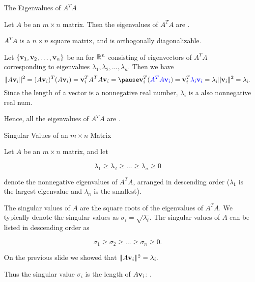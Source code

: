 \documentclass[xcolor=dvipsnames,aspectratio=169,t]{beamer}
\begin{document}
\begin{frame}{The Eigenvalues of $A^T A$}
  \smallskip
  
  \begin{theorem}
    Let $A$ be an $m \times n$ matrix.
    Then the \alert{eigenvalues of $A^TA$} are .
  \end{theorem}
  \medskip

  \pause
  \smallskip
  
  $A^T A$ is a  $n\times n$ square matrix, and is \alert{orthogonally diagonalizable.}
  \medskip
  
  Let $\{ \mathbf{v}_1,\mathbf{v}_2,\ldots,\mathbf{v}_n \}$ be an  for $\mathbb{R}^n$ consisting of eigenvectors of $A^T A$ corresponding to eigenvalues $\lambda_1,\lambda_2,\ldots,\lambda_n$.
  \pause
  Then we have
  \[ \| A \v_i \|^2 = (A\v_i)^T (A\v_i) = \v_i^T A^TA \v_i =
  \pause 
  \v_i^T (\colorb{A^TA \v_i}) = \v_i^T \colorb{\lambda_i \v_i} =
  \lambda_i \| \v_i \| ^2 = \lambda_i. \]
  Since the length of a vector is a nonnegative real number, $\lambda_i$ is a also nonnegative real num.
  \medskip
  
  Hence, all the \alert{eigenvalues of $A^T A$} are .
  \hfill\blue{\qed}
\end{frame}


\begin{frame}{Singular Values of an $m \times n$ Matrix}
  \smallskip

  Let $A$ be an $m \times n$ matrix, and let 
  \vspace*{-1em}
  
  \[  \lambda_1 \geq \lambda_2 \geq \ldots \geq \lambda_n \geq 0\]
  \vspace*{-1em}
  
  denote the nonnegative \alert{eigenvalues of $A^T A$}, arranged in descending order 
  ($\lambda_1$ is the largest eigenvalue and $\lambda_n$ is the smallest).
  \medskip

  \begin{definition}
    The \alert{singular values} of $A$ are the square roots of the eigenvalues of $A^TA$.
    We typically denote the singular values as $\sigma_i = \sqrt{\lambda_i}$.
    The singular values of $A$ can be listed in descending order as
    \vspace*{-1em}
    
    \[ \sigma_1 \geq \sigma_2 \geq \ldots \geq \sigma_n \geq 0.\]
  \end{definition}
  \medskip
  
  On the previous slide we showed that $\| A \mathbf{v}_i \|^2 = \lambda_i$.
  \medskip
  
  Thus the singular value $\sigma_i$ is the \alert{length} of $A\mathbf{v}_i$:
  .
\end{frame}
\end{document}
